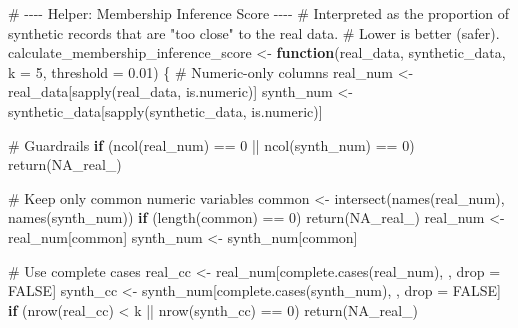 \documentclass[
  letterpaper,
  DIV=11,
  numbers=noendperiod]{scrartcl}
\newenvironment{Shaded}{\begin{snugshade}}{\end{snugshade}}
\newcommand{\AttributeTok}[1]{\textcolor[rgb]{0.40,0.45,0.13}{#1}}
\newcommand{\CommentTok}[1]{\textcolor[rgb]{0.37,0.37,0.37}{#1}}
\newcommand{\ConstantTok}[1]{\textcolor[rgb]{0.56,0.35,0.01}{#1}}
\newcommand{\ControlFlowTok}[1]{\textcolor[rgb]{0.00,0.23,0.31}{\textbf{#1}}}
\newcommand{\DecValTok}[1]{\textcolor[rgb]{0.68,0.00,0.00}{#1}}
\newcommand{\FloatTok}[1]{\textcolor[rgb]{0.68,0.00,0.00}{#1}}
\newcommand{\FunctionTok}[1]{\textcolor[rgb]{0.28,0.35,0.67}{#1}}
\newcommand{\NormalTok}[1]{\textcolor[rgb]{0.00,0.23,0.31}{#1}}
\newcommand{\OtherTok}[1]{\textcolor[rgb]{0.00,0.23,0.31}{#1}}
\newcommand{\SpecialCharTok}[1]{\textcolor[rgb]{0.37,0.37,0.37}{#1}}
\begin{document}
\begin{Shaded}
\begin{Highlighting}[]
\CommentTok{\# {-}{-}{-}{-} Helper: Membership Inference Score {-}{-}{-}{-}}
\CommentTok{\# Interpreted as the proportion of synthetic records that are "too close" to the real data.}
\CommentTok{\# Lower is better (safer).}
\NormalTok{calculate\_membership\_inference\_score }\OtherTok{\textless{}{-}} \ControlFlowTok{function}\NormalTok{(real\_data, synthetic\_data, }\AttributeTok{k =} \DecValTok{5}\NormalTok{, }\AttributeTok{threshold =} \FloatTok{0.01}\NormalTok{) \{}
  \CommentTok{\# Numeric{-}only columns}
\NormalTok{  real\_num  }\OtherTok{\textless{}{-}}\NormalTok{ real\_data[}\FunctionTok{sapply}\NormalTok{(real\_data, is.numeric)]}
\NormalTok{  synth\_num }\OtherTok{\textless{}{-}}\NormalTok{ synthetic\_data[}\FunctionTok{sapply}\NormalTok{(synthetic\_data, is.numeric)]}

  \CommentTok{\# Guardrails}
  \ControlFlowTok{if}\NormalTok{ (}\FunctionTok{ncol}\NormalTok{(real\_num) }\SpecialCharTok{==} \DecValTok{0} \SpecialCharTok{||} \FunctionTok{ncol}\NormalTok{(synth\_num) }\SpecialCharTok{==} \DecValTok{0}\NormalTok{) }\FunctionTok{return}\NormalTok{(}\ConstantTok{NA\_real\_}\NormalTok{)}

  \CommentTok{\# Keep only common numeric variables}
\NormalTok{  common }\OtherTok{\textless{}{-}} \FunctionTok{intersect}\NormalTok{(}\FunctionTok{names}\NormalTok{(real\_num), }\FunctionTok{names}\NormalTok{(synth\_num))}
  \ControlFlowTok{if}\NormalTok{ (}\FunctionTok{length}\NormalTok{(common) }\SpecialCharTok{==} \DecValTok{0}\NormalTok{) }\FunctionTok{return}\NormalTok{(}\ConstantTok{NA\_real\_}\NormalTok{)}
\NormalTok{  real\_num  }\OtherTok{\textless{}{-}}\NormalTok{ real\_num[common]}
\NormalTok{  synth\_num }\OtherTok{\textless{}{-}}\NormalTok{ synth\_num[common]}

  \CommentTok{\# Use complete cases}
\NormalTok{  real\_cc  }\OtherTok{\textless{}{-}}\NormalTok{ real\_num[}\FunctionTok{complete.cases}\NormalTok{(real\_num), , drop }\OtherTok{=} \ConstantTok{FALSE}\NormalTok{]}
\NormalTok{  synth\_cc }\OtherTok{\textless{}{-}}\NormalTok{ synth\_num[}\FunctionTok{complete.cases}\NormalTok{(synth\_num), , drop }\OtherTok{=} \ConstantTok{FALSE}\NormalTok{]}
  \ControlFlowTok{if}\NormalTok{ (}\FunctionTok{nrow}\NormalTok{(real\_cc) }\SpecialCharTok{\textless{}}\NormalTok{ k }\SpecialCharTok{||} \FunctionTok{nrow}\NormalTok{(synth\_cc) }\SpecialCharTok{==} \DecValTok{0}\NormalTok{) }\FunctionTok{return}\NormalTok{(}\ConstantTok{NA\_real\_}\NormalTok{)}


\end{Highlighting}
\end{Shaded}
\end{document}
